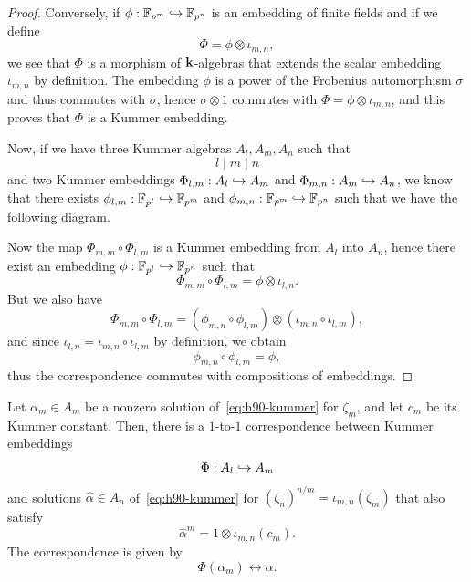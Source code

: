 \begin{proof}
Conversely, if $\phi:\mathbb{F}_{p^{m}}\hookrightarrow\mathbb{F}_{p^n}$ is an embedding of
finite fields and if we define
\[
  \Phi = \phi\otimes\iota_{m, n},
\]
we see that $\Phi$ is a morphism of $\mathbf{k}$-algebras that extends the scalar embedding
$\iota_{m, n}$ by definition.
The embedding $\phi$ is a power of the Frobenius automorphism $\sigma$ and thus
commutes with $\sigma$, hence $\sigma\otimes1$ commutes with
$\Phi=\phi\otimes\iota_{m, n}$, and this proves that $\Phi$ is a Kummer
embedding.

Now, if we have three Kummer algebras $A_l, A_m, A_n$ such that 
\[
  l\mid m\mid n
\]
and two Kummer embeddings $\Phi_{l, m}:A_l\hookrightarrow A_m$ and $\Phi_{m, n}:A_m\hookrightarrow
A_n$, we know that there exists $\phi_{l,
m}:\mathbb{F}_{p^l}\hookrightarrow\mathbb{F}_{p^m}$ and $\phi_{m,
n}:\mathbb{F}_{p^{m}}\hookrightarrow\mathbb{F}_{p^{n}}$ such that we have the following
diagram.
\begin{center}
\end{center}
Now the map $\Phi_{m, m}\circ\Phi_{l,m}$ is a Kummer embedding from $A_l$ into
$A_n$, hence there exist an embedding
$\phi:\mathbb{F}_{p^{l}}\hookrightarrow\mathbb{F}_{p^{n}}$ such that 
\[
  \Phi_{m, m}\circ\Phi_{l,m}=\phi\otimes\iota_{l, n}.
\]
But we also have 
\[
  \Phi_{m, m}\circ\Phi_{l,m}=(\phi_{m, n}\circ\phi_{l,
  m})\otimes(\iota_{m, n}\circ\iota_{l, m}),
\]
and since $\iota_{l,n}=\iota_{m, n}\circ\iota_{l, m}$ by definition, we obtain
\[
  \phi_{m, n}\circ\phi_{l, m}=\phi,
\]
thus the correspondence commutes with compositions of embeddings.
\end{proof}
\begin{prop}
  \label{prop:correspondence-solutions}
  Let $\alpha_m\in A_m$ be a nonzero solution of~\eqref{eq:h90-kummer} for
  $\zeta_m$, and let $c_m$ be its Kummer constant. Then, there is a $1$-to-$1$
  correspondence between Kummer embeddings
  \[
    \Phi:A_l\hookrightarrow A_m
  \]
  and solutions $\hat\alpha\in A_n$ of~\eqref{eq:h90-kummer} for
  $(\zeta_n)^{n/m}=\iota_{m, n}(\zeta_m)$ that also satisfy
  \[
    \hat\alpha^m = 1\otimes\iota_{m, n}(c_m).
  \]
  The correspondence is given by
  \[
    \Phi(\alpha_m)\longleftrightarrow \hat\alpha.
  \]
\end{prop}
